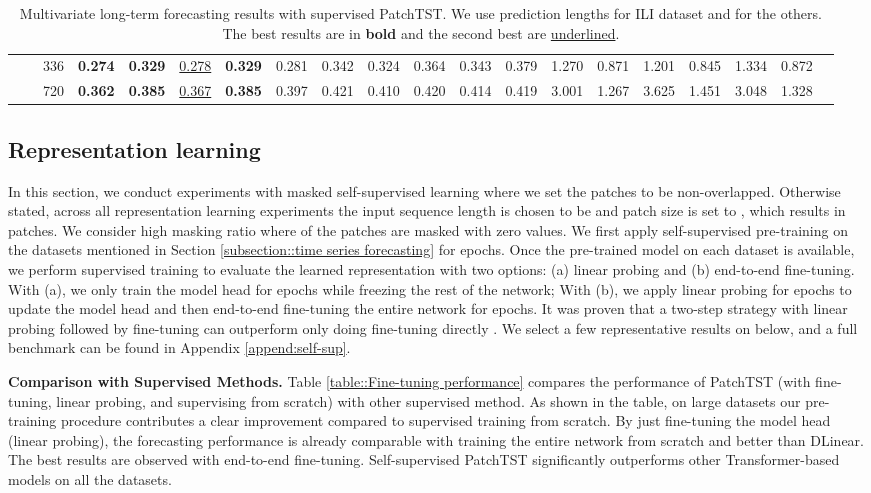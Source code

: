 \documentclass{article} \usepackage{iclr2023_conference,times}
\begin{document}
\begin{table*}[t]
{\begin{tabular}{cc|c|cc|cc|cc|cc|cc|cc|cc|ccc}
            &\multicolumn{1}{c|}{}& 336   & \textbf{0.274} & \textbf{0.329} & \uline{0.278} & \textbf{0.329} & 0.281 & 0.342 & 0.324 & 0.364 & 0.343 & 0.379 & 1.270 & 0.871 & 1.201 & 0.845 & 1.334 & 0.872 \\
            &\multicolumn{1}{c|}{}& 720   & \textbf{0.362} & \textbf{0.385} & \uline{0.367} & \textbf{0.385} & 0.397 & 0.421 & 0.410 & 0.420 & 0.414 & 0.419 & 3.001 & 1.267 & 3.625 & 1.451 & 3.048 & 1.328 \\
			\cline{2-19}
		\end{tabular}
	}
	\caption{Multivariate long-term forecasting results with supervised PatchTST. We use prediction lengths  for ILI dataset and  for the others. The best results are in \textbf{bold} and the second best are \uline{underlined}.}
	\label{tab:supervised}
\end{table*}
\linespread{1}


\subsection{Representation learning}

In this section, we conduct experiments with masked self-supervised learning where we set the patches to be non-overlapped. Otherwise stated, across all representation learning experiments the input sequence length is chosen to be  and patch size is set to , which results in  patches. We consider high masking ratio where  of the patches are masked with zero values. We first apply self-supervised pre-training on the datasets mentioned in Section \ref{subsection::time series forecasting} for  epochs. Once the pre-trained model on each dataset is available, we perform supervised training to evaluate the learned representation with two options: (a) linear probing and (b) end-to-end fine-tuning. With (a), we only train the model head for  epochs while freezing the rest of the network; With (b), we apply linear probing for  epochs to update the model head and then end-to-end fine-tuning the entire network for  epochs. It was proven that a two-step strategy with linear probing followed by fine-tuning can outperform only doing fine-tuning directly \citep{lp-ft}. We select a few representative results on below, and a full benchmark can be found in Appendix \ref{append:self-sup}.

\textbf{Comparison with Supervised Methods.} Table \ref{table::Fine-tuning performance} compares the performance of PatchTST (with fine-tuning, linear probing, and supervising from scratch) with other supervised method. As shown in the table, on large datasets our pre-training procedure contributes a clear improvement compared to supervised training from scratch. By just fine-tuning the model head (linear probing), the forecasting performance is already comparable with training the entire network from scratch and better than DLinear. The best results are observed with end-to-end fine-tuning. Self-supervised PatchTST significantly outperforms other Transformer-based models on all the datasets. 
\end{document}
